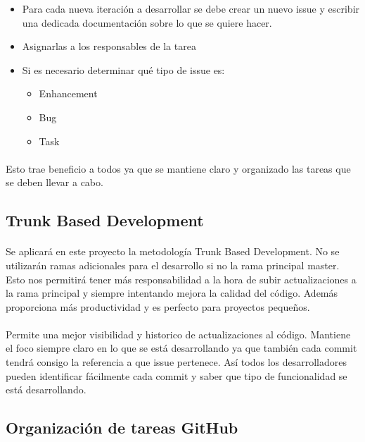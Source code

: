 \begin{itemize}
\item
  Para cada nueva iteración a desarrollar se debe crear un nuevo issue y escribir una dedicada documentación sobre lo que se quiere hacer.
\item
  Asignarlas a los responsables de la tarea
\item
  Si es necesario determinar qué tipo de issue es:
  \begin{itemize}
  \item
    Enhancement
  \item	
    Bug
  \item
    Task
  \end{itemize}
\end{itemize}

\paragraph{}
Esto trae beneficio a todos ya que se mantiene claro y organizado las tareas que se deben llevar a cabo.

\subsection{Trunk Based Development}
\paragraph{}
Se aplicará en este proyecto la metodología Trunk Based Development. No se utilizarán ramas adicionales para el desarrollo si no la rama principal master. Esto nos permitirá tener más responsabilidad a la hora de subir actualizaciones a la rama principal y siempre intentando mejora la calidad del código. Además proporciona más productividad y es perfecto para proyectos pequeños. 

\paragraph{}
Permite una mejor visibilidad y historico de actualizaciones al código. Mantiene el foco siempre claro en lo que se está desarrollando ya que también cada commit tendrá consigo la referencia a que issue pertenece. Así todos los desarrolladores pueden identificar fácilmente cada commit y saber que tipo de funcionalidad se está desarrollando. 

\subsection{Organización de tareas GitHub}

